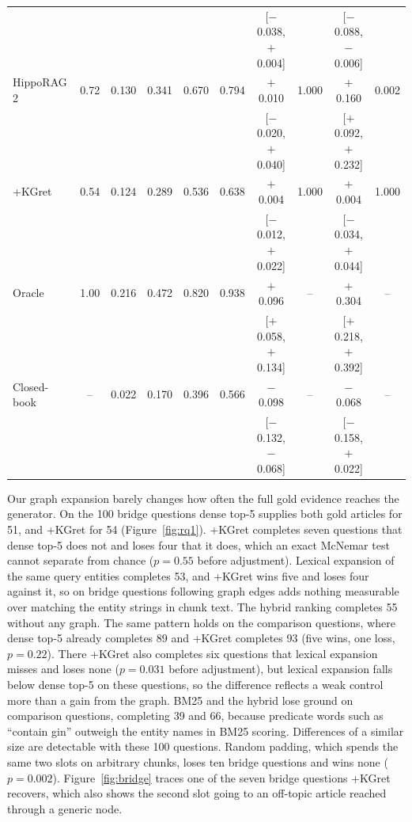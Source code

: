 \documentclass[preprint,12pt]{elsarticle}
\begin{document}
\begin{table}[!tbp]
{\begin{tabular}{@{}lccccccccc@{}}
 &  &  &  &  &  & {\scriptsize[$-$0.038, $+$0.004]} &  & {\scriptsize[$-$0.088, $-$0.006]} &  \\[1pt]
HippoRAG\,2 & 0.72 & 0.130 & 0.341 & 0.670 & 0.794 & $+$0.010 & 1.000 & $+$0.160 & 0.002 \\
 &  &  &  &  &  & {\scriptsize[$-$0.020, $+$0.040]} &  & {\scriptsize[$+$0.092, $+$0.232]} &  \\[1pt]
+KGret & 0.54 & 0.124 & 0.289 & 0.536 & 0.638 & $+$0.004 & 1.000 & $+$0.004 & 1.000 \\
 &  &  &  &  &  & {\scriptsize[$-$0.012, $+$0.022]} &  & {\scriptsize[$-$0.034, $+$0.044]} &  \\[1pt]
\midrule
Oracle & 1.00 & 0.216 & 0.472 & 0.820 & 0.938 & $+$0.096 & -- & $+$0.304 & -- \\
 &  &  &  &  &  & {\scriptsize[$+$0.058, $+$0.134]} &  & {\scriptsize[$+$0.218, $+$0.392]} &  \\[1pt]
Closed-book & -- & 0.022 & 0.170 & 0.396 & 0.566 & $-$0.098 & -- & $-$0.068 & -- \\
 &  &  &  &  &  & {\scriptsize[$-$0.132, $-$0.068]} &  & {\scriptsize[$-$0.158, $+$0.022]} &  \\[1pt]
\bottomrule
\end{tabular}}
\end{table}



Our graph expansion barely changes how often the full gold evidence reaches
the generator. On the 100 bridge questions dense top-5 supplies both gold articles
for 51, and +KGret for 54 (Figure~\ref{fig:rq1}). +KGret completes seven
questions that dense top-5 does not and loses four that it does, which an
exact McNemar test cannot separate from chance ($p=0.55$ before adjustment).
Lexical expansion of the same query entities completes 53, and +KGret wins
five and loses four against it, so on bridge questions following graph edges
adds nothing measurable over matching the entity strings in chunk text. The
hybrid ranking completes 55 without any graph. The same pattern holds on the
comparison questions, where dense top-5 already completes 89 and +KGret
completes 93 (five wins, one loss, $p=0.22$). There +KGret also completes six
questions that lexical expansion misses and loses none ($p=0.031$ before
adjustment), but lexical expansion falls below dense top-5 on these questions,
so the difference reflects a weak control more than a gain from the graph.
BM25 and the hybrid lose ground on comparison questions, completing 39 and 66,
because predicate words such as ``contain gin'' outweigh the entity names in
BM25 scoring. Differences of a similar size are detectable with these 100
questions. Random padding, which spends the same two slots on arbitrary
chunks, loses ten bridge questions and wins none ($p=0.002$). Figure~\ref{fig:bridge} traces one of the seven bridge questions
+KGret recovers, which also shows the second slot going to an off-topic
article reached through a generic node.
\end{document}
